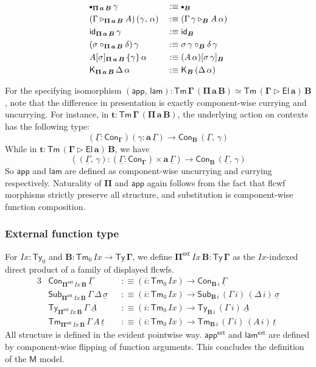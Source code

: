 \documentclass[12pt,a4paper,twoside,openany]{book}
\theoremstyle{remark}
\theoremstyle{definition}
\theoremstyle{theorem}
\newcommand{\mi}[1]{\mathit{#1}}
\newcommand{\ms}[1]{\mathsf{#1}}
\newcommand{\bs}[1]{\boldsymbol{#1}}
\newcommand{\Ix}{\mi{Ix}}
\newcommand{\id}{\mathsf{id}}
\newcommand{\Con}{\mathsf{Con}}
\newcommand{\Sub}{\mathsf{Sub}}
\newcommand{\Tm}{\mathsf{Tm}}
\newcommand{\Ty}{\mathsf{Ty}}
\newcommand{\El}{\mathsf{El}}
\newcommand{\ext}{\triangleright}
\newcommand{\emptycon}{\scaleobj{.75}\bullet}
\newcommand{\Pie}{\Pi^{\mathsf{ext}}}
\newcommand{\appe}{\mathsf{app^{ext}}}
\newcommand{\lame}{\mathsf{lam^{ext}}}
\newcommand{\K}{\mathsf{K}}
\newcommand{\bGamma}{\bs{\Gamma}}
\newcommand{\ba}{\bs{a}}
\newcommand{\bB}{\bs{B}}
\newcommand{\bM}{\bs{\mathsf{M}}}
\newcommand{\ul}[1]{\underline{#1}}
\newcommand{\ulGamma}{\ul{\Gamma}}
\newcommand{\ulsigma}{\ul{\sigma}}
\newcommand{\ult}{\ul{t}}
\newcommand{\ulA}{\ul{A}}
\newcommand{\app}{\ms{app}}
\newcommand{\lam}{\ms{lam}}
\newcommand{\defn}{:\equiv}
\begin{document}
\begin{alignat*}{3}
  &\emptycon_{\bs{\Pi\,a\,B}}\,\gamma &&\defn \emptycon_{\bB}\\
  &(\Gamma \ext_{\bs{\Pi\,a\,B}} A)\,(\gamma,\,\alpha) &&\defn (\Gamma\,\gamma \ext_{\bB} A\,\alpha)\\
  &\id_{\bs{\Pi\,a\,B}}\,\gamma &&\defn \id_{\bB}\\
  &(\sigma \circ_{\bs{\Pi\,a\,B}} \delta)\,\gamma &&\defn \sigma\,\gamma \circ_{\bB} \delta\,\gamma\\
  &A[\sigma]_{\bs{\Pi\,a\,B}}\,\{\gamma\}\,\alpha &&\defn (A\,\alpha)[\sigma\,\gamma]_{\bB}\\
  &\K_{\bs{\Pi\,a\,B}}\,\Delta\,\alpha &&\defn \K_{\bB}\,(\Delta\,\alpha)
\end{alignat*}

For the specifying isomorphism $\bs{(\app,\,\lam) : \Tm\,\Gamma\,(\Pi\,a\,B)
  \simeq \Tm\,(\Gamma \ext \El\,a)\,B}$, note that the difference in
presentation is exactly component-wise currying and uncurrying. For instance, in
$\bs{t : \Tm\,\Gamma\,(\Pi\,a\,B)}$, the underlying action on contexts has the following
type:
\[
  (\ulGamma : \Con_{\bGamma})(\gamma : \ba\,\ulGamma) \to \Con_{\bB}\,(\ulGamma,\,\gamma)
\]
While in $\bs{t : \Tm\,(\Gamma \ext \El\,a)\,B}$, we have
\[
  ((\ulGamma,\,\gamma) : (\ulGamma : \Con_{\bGamma}) \times \ba\,\ulGamma) \to \Con_{\bB}\,(\ulGamma,\,\gamma)
\]
So $\bs{\app}$ and $\bs{\lam}$ are defined as component-wise uncurrying and
currying respectively.  Naturality of $\bs{\Pi}$ and $\bs{\app}$ again follows
from the fact that flcwf morphisms strictly preserve all structure, and
substitution is component-wise function composition.

\subsubsection{External function type}

For $\Ix : \Ty_0$ and $\bB : \Tm_0\,\Ix \to \bs{\Ty\,\Gamma}$, we define
$\bs{\Pie}\,\Ix\,\bB : \bs{\Ty\,\Gamma}$ as the $\Ix$-indexed direct product of
a family of displayed flcwfs.
\begin{alignat*}{3}
  & \Con_{\bs{\Pie}\,\Ix\,\bB}\,\ulGamma &&\defn (i : \Tm_0\,\Ix) \to \Con_{\bB\,i}\,\ulGamma\\
  & \Sub_{\bs{\Pie}\,\Ix\,\bB}\,\Gamma\,\Delta\,\ulsigma &&\defn (i : \Tm_0\,\Ix) \to \Sub_{\bB\,i}\,(\Gamma\,i)\,(\Delta\,i)\,\ulsigma\\
  &  \Ty_{\bs{\Pie}\,\Ix\,\bB}\,\Gamma\,\ulA &&\defn (i : \Tm_0\,\Ix) \to \Ty_{\bB\,i}\,(\Gamma\,i)\,\ulA\\
  &  \Tm_{\bs{\Pie}\,\Ix\,\bB}\,\Gamma\,A\,\ult &&\defn (i : \Tm_0\,\Ix) \to \Tm_{\bB\,i}\,(\Gamma\,i)\,(A\,i)\,\ult
\end{alignat*}
All structure is defined in the evident pointwise way. $\bs{\appe}$ and
$\bs{\lame}$ are defined by component-wise flipping of function arguments. This
concludes the definition of the $\bM$ model.
\end{document}
